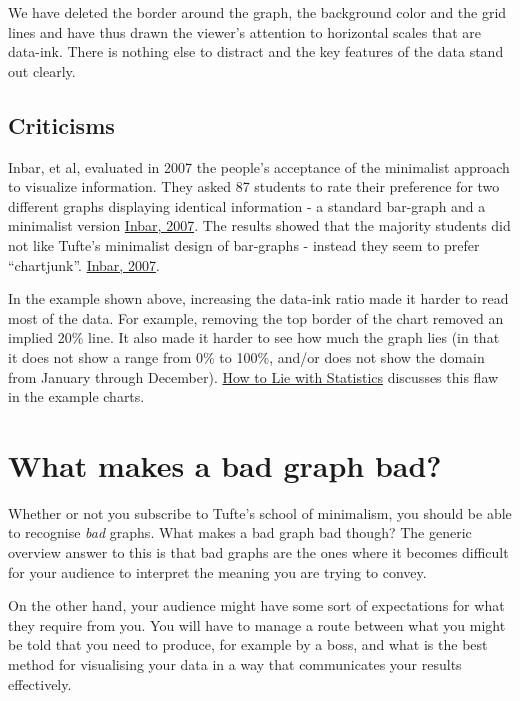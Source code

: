 \documentclass[]{book}
\theoremstyle{definition}
\theoremstyle{definition}
\theoremstyle{definition}
\theoremstyle{remark}
\begin{document}
We have deleted the border around the graph, the background color and
the grid lines and have thus drawn the viewer's attention to horizontal
scales that are data-ink. There is nothing else to distract and the key
features of the data stand out clearly.

\hypertarget{criticisms}{%
\subsection{Criticisms}\label{criticisms}}

Inbar, et al, evaluated in 2007 the people's acceptance of the
minimalist approach to visualize information. They asked 87 students to
rate their preference for two different graphs displaying identical
information - a standard bar-graph and a minimalist version
\href{http://portal.acm.org/citation.cfm?id=1362587}{Inbar, 2007}. The
results showed that the majority students did not like Tufte's
minimalist design of bar-graphs - instead they seem to prefer
``chartjunk''.
\href{http://portal.acm.org/citation.cfm?id=1362587}{Inbar, 2007}.

In the example shown above, increasing the data-ink ratio made it harder
to read most of the data. For example, removing the top border of the
chart removed an implied 20\% line. It also made it harder to see how
much the graph lies (in that it does not show a range from 0\% to 100\%,
and/or does not show the domain from January through December).
\href{https://www.librarysearch.manchester.ac.uk/primo-explore/fulldisplay?docid=44MAN_ALMA_DS21134626320001631\&context=L\&vid=MU_NUI\&search_scope=BLENDED\&isFrbr=true\&tab=local\&lang=en_US}{How
to Lie with Statistics} discusses this flaw in the example charts.

\hypertarget{what-makes-a-bad-graph-bad}{%
\section{What makes a bad graph bad?}\label{what-makes-a-bad-graph-bad}}

Whether or not you subscribe to Tufte's school of minimalism, you should
be able to recognise \emph{bad} graphs. What makes a bad graph bad
though? The generic overview answer to this is that bad graphs are the
ones where it becomes difficult for your audience to interpret the
meaning you are trying to convey.

On the other hand, your audience might have some sort of expectations
for what they require from you. You will have to manage a route between
what you might be told that you need to produce, for example by a boss,
and what is the best method for visualising your data in a way that
communicates your results effectively.
\end{document}
